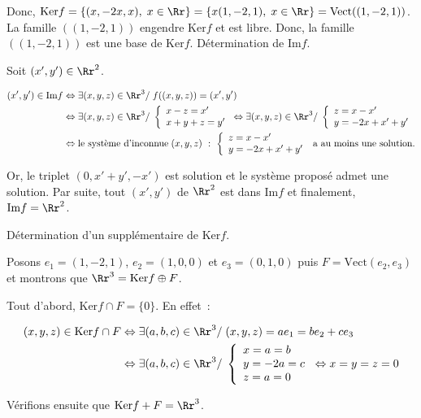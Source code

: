 {\begin{enumerate}
{Donc, $\mbox{Ker}f=\{(x,-2x,x),\;x\in\Rr\}=\{x(1,-2,1),\;x\in\Rr\}=\mbox{Vect}((1,-2,1))$.
La famille $((1,-2,1))$ engendre $\mbox{Ker}f$ et est libre. Donc, la famille $((1,-2,1))$ est une base de
$\mbox{Ker}f$.
Détermination de $\mbox{Im}f$.

Soit $(x',y')\in\Rr^2$.

\begin{align*}
(x',y')\in\mbox{Im}f&\Leftrightarrow\exists(x,y,z)\in\Rr^3/\;f((x,y,z))=(x',y')\\
 &\Leftrightarrow\exists(x,y,z)\in\Rr^3/\;
\left\{
\begin{array}{l}
x-z=x'\\
x+y+z=y'
\end{array}
\right.
\Leftrightarrow\exists(x,y,z)\in\Rr^3/\;
\left\{
\begin{array}{l}
z=x-x'\\
y=-2x+x'+y'
\end{array}
\right.\\
 &\Leftrightarrow\mbox{le système d'inconnue}\;(x,y,z)~:~\left\{
\begin{array}{l}
z=x-x'\\
y=-2x+x'+y'
\end{array}
\right.
\;\mbox{a au moins une solution.}
\end{align*}

Or, le triplet $(0,x'+y',-x')$ est solution et le système proposé admet une solution. Par suite, tout $(x',y')$ de
$\Rr^2$ est dans $\mbox{Im}f$ et finalement, $\mbox{Im}f=\Rr^2$.

Détermination d'un supplémentaire de $\mbox{Ker}f$.

Posons $e_1=(1,-2,1)$, $e_2=(1,0,0)$ et $e_3=(0,1,0)$ puis $F=\mbox{Vect}(e_2,e_3)$ et montrons que
$\Rr^3=\mbox{Ker}f\oplus F$.

Tout d'abord, $\mbox{Ker}f\cap F=\{0\}$. En effet~:

\begin{align*}
(x,y,z)\in\mbox{Ker}f\cap F&\Leftrightarrow\exists(a,b,c)\in\Rr^3/\;(x,y,z)=ae_1=be_2+ce_3\\
 &\Leftrightarrow\exists(a,b,c)\in\Rr^3/\;
\left\{
\begin{array}{l}
x=a=b\\
y=-2a=c\\
z=a=0
\end{array}
\right.
\Leftrightarrow x=y=z=0
\end{align*}

Vérifions ensuite que $\mbox{Ker}f+F=\Rr^3$.

}
\end{enumerate}}
